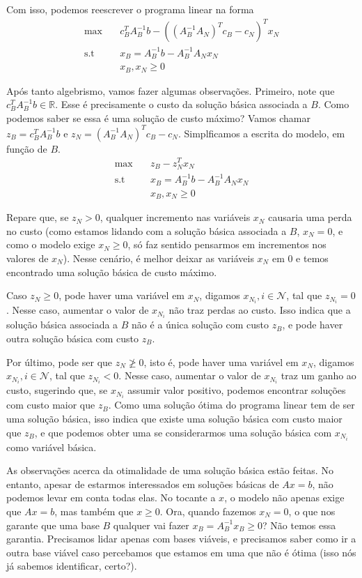 \documentclass[]{article}
\numberwithin{equation}{section}
\begin{document}
Com isso, podemos reescrever o programa linear na forma
\begin{align}
\max        &\quad  c_B^TA_B^{-1}b - ((A_B^{-1}A_N)^Tc_B - c_N)^Tx_N \\
\text{s.t}  &\quad  x_B = A_B^{-1}b - A_B^{-1}A_Nx_N \\
            &\quad  x_B, x_N \geq 0
\end{align}

Após tanto algebrismo, vamos fazer algumas observações.
Primeiro, note que $c_B^TA_B^{-1}b \in \mathbb{R}$.
Esse é precisamente o custo da solução básica associada a $B$.
Como podemos saber se essa é uma solução de custo máximo?
Vamos chamar $z_B = c_B^TA_B^{-1}b$ e $z_N = (A_B^{-1}A_N)^Tc_B - c_N$.
Simplficamos a escrita do modelo, em função de $B$.
\begin{align}
\max        &\quad  z_B - z_N^Tx_N \\
\text{s.t}  &\quad  x_B = A_B^{-1}b - A_B^{-1}A_Nx_N \\
            &\quad  x_B, x_N \geq 0
\end{align}

Repare que, se $z_N > 0$, qualquer incremento nas variáveis $x_N$ causaria uma perda no custo (como
estamos lidando com a solução básica associada a $B$, $x_N = 0$, e como o modelo exige $x_N \geq 0$,
só faz sentido pensarmos em incrementos nos valores de $x_N$).
Nesse cenário, é melhor deixar as variáveis $x_N$ em 0 e temos encontrado uma solução básica de custo
máximo.

Caso $z_N \geq 0$, pode haver uma variável em $x_N$, digamos $x_{N_i}, i \in \mathcal{N}$, tal que
$z_{N_i} = 0$.
Nesse caso, aumentar o valor de $x_{N_i}$ não traz perdas ao custo.
Isso indica que a solução básica associada a $B$ não é a única solução com custo $z_B$, e pode haver
outra solução básica com custo $z_B$.

Por último, pode ser que $z_N \not\geq 0$, isto é, pode haver uma variável em $x_N$, digamos
$x_{N_i}, i \in \mathcal{N}$, tal que $z_{N_i} < 0$.
Nesse caso, aumentar o valor de $x_{N_i}$ traz um ganho ao custo, sugerindo que, se $x_{N_i}$
assumir valor positivo, podemos encontrar soluções com custo maior que $z_B$.
Como uma solução ótima do programa linear tem de ser uma solução básica, isso indica que existe uma
solução básica com custo maior que $z_B$, e que podemos obter uma se considerarmos uma solução básica
com $x_{N_i}$ como variável básica.

As observações acerca da otimalidade de uma solução básica estão feitas.
No entanto, apesar de estarmos interessados em soluções básicas de $Ax = b$, não podemos levar em
conta todas elas.
No tocante a $x$, o modelo não apenas exige que $Ax = b$, mas também que $x \geq 0$.
Ora, quando fazemos $x_N = 0$, o que nos garante que uma base $B$ qualquer vai fazer
$x_B = A_B^{-1}x_B \geq 0$?
Não temos essa garantia.
Precisamos lidar apenas com bases viáveis, e precisamos saber como ir a outra base viável caso
percebamos que estamos em uma que não é ótima (isso nós já sabemos identificar, certo?).
\end{document}
